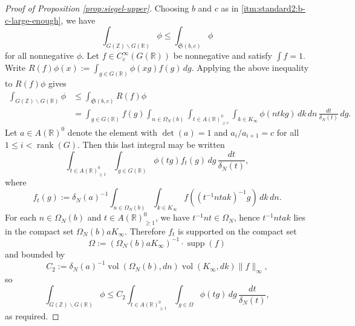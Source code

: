 \documentclass[reqno]{amsart}
\DeclareMathOperator{\rank}{rank}
\DeclareMathOperator{\vol}{vol}
\DeclareMathOperator{\supp}{supp}
\theoremstyle{plain} \newtheorem{theorem} {Theorem}
\theoremstyle{definition} \newtheorem{definition} [theorem] {Definition}
\theoremstyle{itplain} %
\numberwithin{equation}{section}
\numberwithin{theorem}{section}
\renewcommand{\geq}{\geqslant}
\renewcommand{\leq}{\leqslant}
\begin{document}
\begin{proof}[Proof of Proposition \ref{prop:siegel-upper}]
Choosing $b$ and $c$ as in \eqref{itm:standard2:b-c-large-enough}, we have
\begin{equation*}
  \int _{G(\mathbb{Z}) \backslash G(\mathbb{R})} \phi \leq \int _{\mathfrak{S}(b,c)} \phi
\end{equation*}
for all nonnegative $\phi$.  Let $f \in C_c^\infty(G(\mathbb{R}))$ be nonnegative and satisfy $\int f = 1$.  Write $R(f) \phi(x) := \int _{g \in G(\mathbb{R})} \phi(x g) f(g) \, d g$.  Applying the above inequality to $R(f) \phi$ gives
\begin{align*}
  \int _{G(\mathbb{Z}) \backslash G(\mathbb{R})} \phi
  &\leq
  \int_{\mathfrak{S}(b,c)} R(f) \phi \\
  &=
  \int _{g \in G(\mathbb{R})} f(g)
  \int _{n \in \Omega_N(b)}
  \int _{t \in A(\mathbb{R})^0_{\geq c}}
  \int _{k \in K_\infty }
  \phi(n t k g)
  \, d k
    \, d n \, \frac{d t}{\delta_N(t)} \, d g.
\end{align*}
Let $a \in A(\mathbb{R})^0$ denote the element with $\det(a) = 1$ and $a_i/a_{i+1} = c$ for all $1 \leq i < \rank(G)$.  Then this last integral may be written
\begin{equation*}
    \int _{t \in A(\mathbb{R})^0_{\geq 1}}
  \int _{g \in G(\mathbb{R})}
  \phi(t g)
  f_t(g) \, d g \, \frac{d t}{\delta_N(t)},
\end{equation*}
where
\begin{equation*}
  f_t(g) :=
  \delta_N(a)^{-1}
  \int _{n \in \Omega_N(b)}
  \int _{k \in K_\infty }
  f((t^{-1} n t a k )^{-1} g)
  \, d k
  \, d n.
\end{equation*}
For each $n \in \Omega_N(b)$ and $t \in A(\mathbb{R})^0_{\geq 1}$, we have $t^{-1} n t \in \Omega_N$, hence $t^{-1} n t a k$ lies in the compact set $\Omega_N(b) a K_\infty$.  Therefore $f_t$ is supported on the compact set
\begin{equation*}
\Omega := (\Omega_N(b) a K_\infty)^{-1} \cdot \supp(f)
\end{equation*}
and bounded by
\begin{equation*}
C_2 := \delta_N(a)^{-1} \vol(\Omega_N(b), d n) \vol(K_\infty, d k) \|f\|_{\infty},
\end{equation*}
so
\begin{equation*}
  \int_{G(\mathbb{Z}) \backslash G(\mathbb{R})} \phi \leq
  C_2 \int _{t \in A(\mathbb{R})^0_{\geq 1}}
  \int _{g \in \Omega } \phi(t g) \, d g \, \frac{d t}{\delta_N(t)},
\end{equation*}
as required.
\end{proof}
\end{document}
